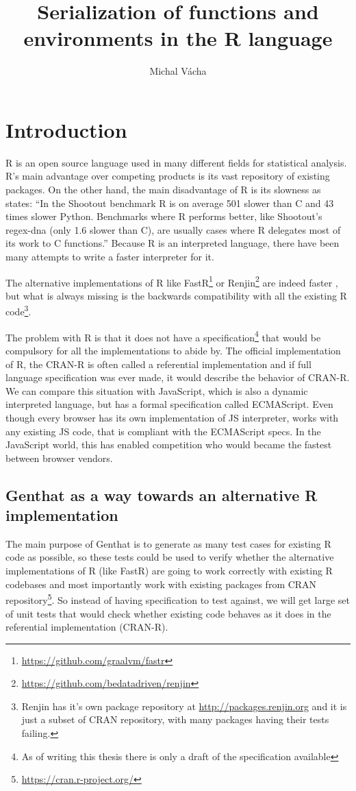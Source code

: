 \documentclass[thesis=B,english]{FITthesis}[2012/10/20]
\title{Serialization of functions and environments in the R language}
\author{Michal Vácha} %
\begin{document}

\chapter{Introduction}


R is an open source language used in many different fields for statistical analysis. R’s main advantage over competing products is its vast repository of existing packages. On the other hand, the main disadvantage of R is its slowness as \cite{vitek} states: ``In the Shootout benchmark R is on average 501 slower than C and 43 times slower Python. Benchmarks where R performs better, like Shootout’s regex-dna (only 1.6 slower than C), are usually cases where R delegates most of its work to C functions.'' Because R is an interpreted language, there have been many attempts to write a faster interpreter for it.

The alternative implementations of R like FastR\footnote{\url{https://github.com/graalvm/fastr}} or Renjin\footnote{\url{https://github.com/bedatadriven/renjin}} are indeed faster \cite{renjin}, but what is always missing is the backwards compatibility with all the existing R code\footnote{Renjin has it's own package repository at \url{http://packages.renjin.org} and it is just a subset of CRAN repository, with many packages having their tests failing.}. 

The problem with R is that it does not have a specification\footnote{As of writing this thesis there is only a draft of the specification available} that would be compulsory for all the implementations to abide by. The official implementation of R, the CRAN-R is often called a referential implementation and if full language specification was ever made, it would describe the behavior of CRAN-R. We can compare this situation with JavaScript, which is also a dynamic interpreted language, but has a formal specification called ECMAScript\cite{EcmaScript}. Even though every browser has its own implementation of JS interpreter, works with any existing JS code, that is compliant with the ECMAScript specs. In the JavaScript world, this has enabled competition who would became the fastest between browser vendors. 

\section{Genthat as a way towards an alternative R implementation}
The main purpose of Genthat is to generate as many test cases for existing R code as possible, so these tests could be used to verify whether the alternative implementations of R (like FastR) are going to work correctly with existing R codebases and most importantly work with existing packages from CRAN repository\footnote{\url{https://cran.r-project.org/}}\cite{testRPoster}. So instead of having specification to test against, we will get large set of unit tests that would check whether existing code behaves as it does in the referential implementation (CRAN-R).
\end{document}
